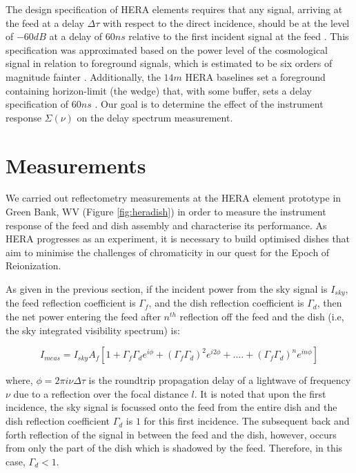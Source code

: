\documentclass[12pt,preprint]{aastex}
\begin{document}
The design specification of HERA elements requires that any
signal, arriving at the feed at a delay $\Delta \tau$ with respect to the direct incidence, should be
at the level of $-60dB$ at a delay of $60ns$ relative to the first incident
signal at the feed \citep{parsons_deboer_memo}. This specification was
approximated based on the power level of the cosmological signal in relation to
foreground signals, which is estimated to be six orders of magnitude fainter
\citep{santos_et_al2005,ali_et_al2008,deoliveira2008,jelic_et_al2008,bernardi_et_al2009,bernardi_et_al2010,ghosh_et_al2011}. Additionally, the $14m$ HERA baselines set a foreground containing
horizon-limit (the wedge) that, with some buffer, sets a delay specification of
$60ns$
\citep{parsons_et_al2012b,vedantham_et_al2012,nithya_et_al2013,liu_et_al2014a,liu_et_al2014b}. Our goal is to determine the effect of the instrument response $\Sigma(\nu)$ on the delay spectrum measurement. 
\section{Measurements}
We carried out reflectometry measurements at the HERA element prototype in Green
Bank, WV (Figure \ref{fig:heradish}) in order to measure the instrument response of the feed and dish assembly and characterise its performance. As HERA progresses as
an experiment, it is necessary to build optimised dishes that aim to minimise the
challenges of chromaticity in our quest for the Epoch of Reionization.

As given in the previous section, if the incident power from the sky signal is $I_{sky}$, the feed
reflection coefficient is $\Gamma_{f}$, and the dish reflection
coefficient is $\Gamma_{d}$, then the net power entering the feed after
$n^{th}$ reflection off the feed and the dish (i.e, the sky integrated visibility spectrum) is:

\begin{equation}\label{eqn:series1}
I_{meas} =  I_{sky}A_{f}[1+ \Gamma_{f}\Gamma_{d} e^{i\phi}+ (\Gamma_{f}\Gamma_{d})^2e^{i2\phi}+ ....+ (\Gamma_{f}\Gamma_{d})^{n}e^{in\phi}]
\end{equation}

where, $\phi = 2\pi i\nu \Delta \tau$ is the roundtrip propagation delay of a lightwave of frequency $\nu$ due to a reflection over the focal distance $l$. It is noted that upon the first incidence, the sky signal is focussed onto the feed from the entire dish and the dish reflection coefficient $\Gamma_{d}$ is $1$ for this first incidence. The subsequent back and forth reflection of the signal in between the feed and the dish, however, occurs from only the part of the dish which is shadowed by the feed. Therefore, in this case, $\Gamma_{d} < 1$.
\end{document}
